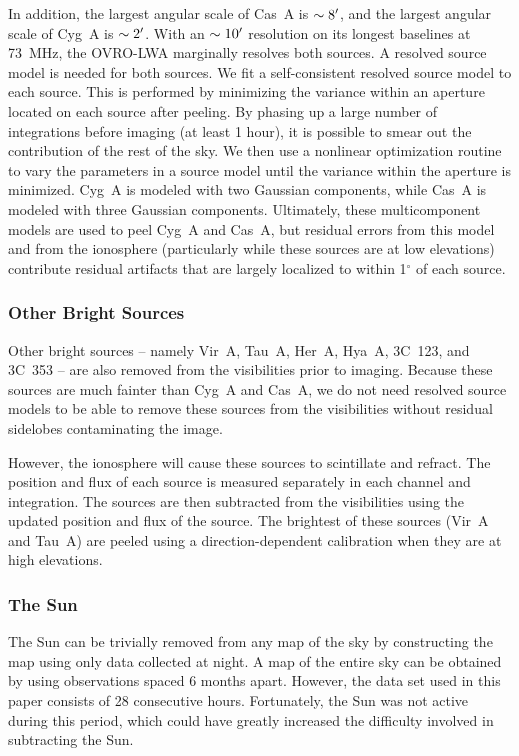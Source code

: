 \begin{bibunit}
In addition, the largest angular scale of Cas~A is $\sim8\mbox{$^\prime$}$, and the largest angular scale of
Cyg~A is $\sim2\mbox{$^\prime$}$. With an $\sim10\mbox{$^\prime$}$ resolution on its longest baselines at 73~MHz, the
OVRO-LWA marginally resolves both sources. A resolved source model is needed for both sources. We
fit a self-consistent resolved source model to each source. This is performed by minimizing the
variance within an aperture located on each source after peeling. By phasing up a large number of
integrations before imaging (at least 1 hour), it is possible to smear out the contribution of the
rest of the sky.  We then use a nonlinear optimization routine \citep[NLopt Sbplx;][]{sbplx, nlopt}
to vary the parameters in a source model until the variance within the aperture is minimized. Cyg~A
is modeled with two Gaussian components, while Cas~A is modeled with three Gaussian components.
Ultimately, these multicomponent models are used to peel Cyg~A and Cas~A, but residual errors from
this model and from the ionosphere (particularly while these sources are at low elevations)
contribute residual artifacts that are largely localized to within 1$^\circ$ of each source.

\subsubsection{Other Bright Sources}

Other bright sources -- namely Vir~A, Tau~A, Her~A, Hya~A, 3C~123, and 3C~353 -- are also removed
from the visibilities prior to imaging. Because these sources are much fainter than Cyg~A and Cas~A,
we do not need resolved source models to be able to remove these sources from the visibilities
without residual sidelobes contaminating the image.

However, the ionosphere will cause these sources to scintillate and refract. The position and flux
of each source is measured separately in each channel and integration. The sources are then
subtracted from the visibilities using the updated position and flux of the source. The brightest of
these sources (Vir~A and Tau~A) are peeled using a direction-dependent calibration when they are at
high elevations.

\subsubsection{The Sun}

The Sun can be trivially removed from any map of the sky by constructing the map using only data
collected at night. A map of the entire sky can be obtained by using observations spaced 6 months
apart.  However, the data set used in this paper consists of 28 consecutive hours. Fortunately, the
Sun was not active during this period, which could have greatly increased the difficulty involved in
subtracting the Sun.


\end{bibunit}
